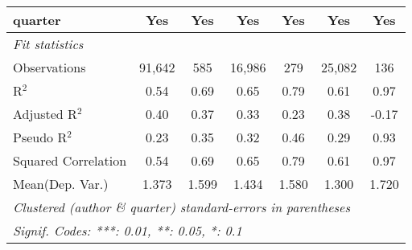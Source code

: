 \begin{tabular}{lcccccc}
   quarter                                                    & Yes           & Yes           & Yes           & Yes         & Yes           & Yes\\  
   \midrule
   \emph{Fit statistics}\\
   Observations                                               & 91,642        & 585           & 16,986        & 279         & 25,082        & 136\\  
   R$^2$                                                      & 0.54          & 0.69          & 0.65          & 0.79        & 0.61          & 0.97\\  
   Adjusted R$^2$                                             & 0.40          & 0.37          & 0.33          & 0.23        & 0.38          & -0.17\\  
   Pseudo R$^2$                                               & 0.23          & 0.35          & 0.32          & 0.46        & 0.29          & 0.93\\  
   Squared Correlation                                        & 0.54          & 0.69          & 0.65          & 0.79        & 0.61          & 0.97\\  
Mean(Dep. Var.) & 1.373 & 1.599 & 1.434 & 1.580 & 1.300 & 1.720 \\
   \midrule \midrule
   \multicolumn{7}{l}{\emph{Clustered (author \& quarter) standard-errors in parentheses}}\\
   \multicolumn{7}{l}{\emph{Signif. Codes: ***: 0.01, **: 0.05, *: 0.1}}\\
\end{tabular}
\par\endgroup
